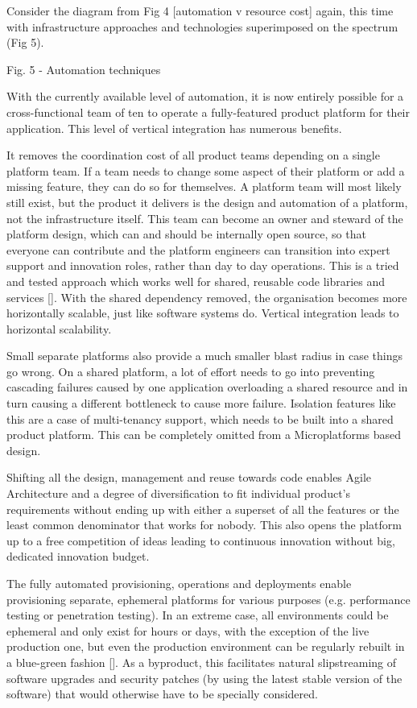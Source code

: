 \documentclass[reprint,amsmath,amssymb,aps]{revtex4-1}
\begin{document}
Consider the diagram from Fig 4 [automation v resource cost] again, this time with infrastructure approaches and technologies superimposed on the spectrum (Fig 5). 

Fig. 5 - Automation techniques

With the currently available level of automation, it is now entirely possible for a cross-functional team of ten to operate a fully-featured product platform for their application. This level of vertical integration has numerous benefits.

It removes the coordination cost of all product teams depending on a single platform team. If a team needs to change some aspect of their platform or add a missing feature, they can do so for themselves. A platform team will most likely still exist, but the product it delivers is the design and automation of a platform, not the infrastructure itself. This team can become an owner and steward of the platform design, which can and should be internally open source, so that everyone can contribute and the platform engineers can transition into expert support and innovation roles, rather than day to day operations. This is a tried and tested approach which works well for shared, reusable code libraries and services []. With the shared dependency removed, the organisation becomes more horizontally scalable, just like software systems do. Vertical integration leads to horizontal scalability.

Small separate platforms also provide a much smaller blast radius in case things go wrong. On a shared platform, a lot of effort needs to go into preventing cascading failures caused by one application overloading a shared resource and in turn causing a different bottleneck to cause more failure. Isolation features like this are a case of multi-tenancy support, which needs to be built into a shared product platform. This can be completely omitted from a Microplatforms based design.

Shifting all the design, management and reuse towards code enables Agile Architecture and a degree of diversification to fit individual product’s requirements without ending up with either a superset of all the features or the least common denominator that works for nobody. This also opens the platform up to a free competition of ideas leading to continuous innovation without big, dedicated innovation budget.

The fully automated provisioning, operations and deployments enable provisioning separate, ephemeral platforms for various purposes (e.g. performance testing or penetration testing). In an extreme case, all environments could be ephemeral and only exist for hours or days, with the exception of the live production one, but even the production environment can be regularly rebuilt in a blue-green fashion []. As a byproduct, this facilitates natural slipstreaming of software upgrades and security patches (by using the latest stable version of the software) that would otherwise have to be specially considered.
\end{document}
